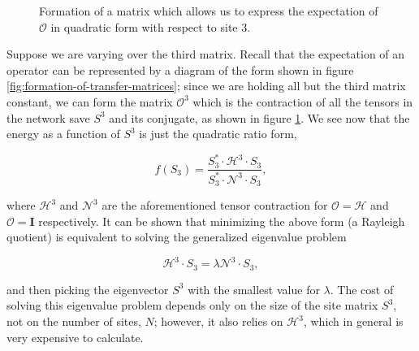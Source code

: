 \documentclass[12pt]{amsbook}
\theoremstyle{plain}
\theoremstyle{definition}
\theoremstyle{remark}
\begin{document}
\begin{figure}
\caption{Formation of a matrix which allows us to express the expectation of $\mathscr{O}$ in quadratic form with respect to site 3.}
\label{fig:Omatrix}
\end{figure}

Suppose we are varying over the third matrix.  Recall that the expectation of an operator can be represented by a diagram of the form shown in figure \ref{fig:formation-of-transfer-matrices};  since we are holding all but the third matrix constant, we can form the matrix $\mathscr{O}^{3}$ which is the contraction of all the tensors in the network save $S^3$ and its conjugate, as shown in figure \ref{fig:Omatrix}.  We see now that the energy as a function of $S^3$ is just the quadratic ratio form,

$$f(S_3) = \frac{S^*_3\cdot \mathscr{H}^3 \cdot S_3}{S^*_3 \cdot \mathscr{N}^3 \cdot S_3},$$

\noindent where $\mathscr{H}^3$ and $\mathscr{N}^3$ are the aforementioned tensor contraction for $\mathscr{O}=\mathscr{H}$ and $\mathscr{O}=\textbf{I}$ respectively.  It can be shown that minimizing the above form (a Rayleigh quotient) is equivalent to solving the generalized eigenvalue problem

$$\mathscr{H}^3 \cdot S_3 = \lambda \mathscr{N}^3\cdot S_3,$$

\noindent and then picking the eigenvector $S^3$ with the smallest value for $\lambda$.  The cost of solving this eigenvalue problem depends only on the size of the site matrix $S^3$, not on the number of sites, $N$;  however, it also relies on $\mathscr{H}^3$, which in general is very expensive to calculate.
\end{document}
